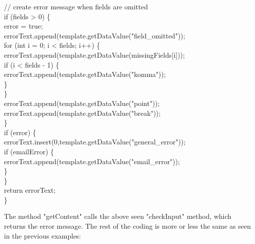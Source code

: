 \begin{java}
\jtabe        // create error message when fields are omitted\\
\jtabe        if (fields > 0) \{\\
\jtabf                error = true;\\
\jtabf                errorText.append(template.getDataValue("field\_omitted"));\\
\jtabf                for (int i = 0; i < fields; i++) \{\\
\jtabf                        errorText.append(template.getDataValue(missingFields[i]));\\
\jtabf                        if (i < fields - 1) \{\\
\jtabf                        errorText.append(template.getDataValue("komma"));\\
\jtabf                        \}\\
\jtabf                \}\\
\jtabf                errorText.append(template.getDataValue("point"));\\
\jtabf                errorText.append(template.getDataValue("break"));\\
\jtabe        \}\\
\jtabe        if (error) \{\\
\jtabf        errorText.insert(0,template.getDataValue("general\_error"));\\
\jtabf                if (emailError) \{\\
\jtabe        errorText.append(template.getDataValue("email\_error"));\\
\jtabf                \}\\
\jtabe        \}\\
\jtabe        return errorText;\\
\}\\
\end{java}

The method {\meth "getContent"} calls the above seen "checkInput" method, which
returns the error message. The rest of the coding is more or less the
same as seen in the previous examples:

